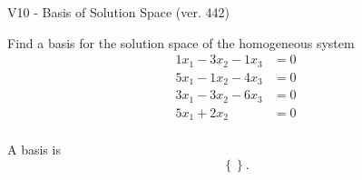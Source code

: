 \begin{exercise}
  \begin{exerciseTitle}V10 - Basis of Solution Space (ver. 442)\end{exerciseTitle}
  \begin{exerciseStatement}
    Find a basis for the solution space of the homogeneous system 
\begin{align*}
 1 x_ 1 -3 x_ 2 -1 x_ 3 &= 0  \\ 
  5 x_ 1 -1 x_ 2 -4 x_ 3 &= 0  \\ 
  3 x_ 1 -3 x_ 2 -6 x_ 3 &= 0  \\ 
  5 x_ 1 + 2 x_ 2 &= 0  \\ 
 \end{align*}


 
  \end{exerciseStatement}

  \begin{exerciseAnswer}
   A basis is   
\[\left\{\right\}.\]

  


  \end{exerciseAnswer}
\end{exercise}